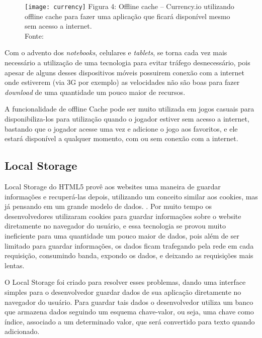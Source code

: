 \begin{figure}[H]
  \centering
	\texttt{[image: currency]}
	\footnotesize\hspace{8\baselineskip}
	Figura 4: Offline cache {--} Currency.io utilizando offline cache para
	fazer uma aplicação que ficará disponível mesmo sem acesso a internet. \\
	Fonte: \cite{website:currencyio}
  \label{img:currency}
\end{figure}

Com o advento dos \textit{notebooks}, celulares e \textit{tablets},
se torna cada vez mais necessário a utilização de uma tecnologia para
evitar tráfego desnecessário, pois apesar
de alguns desses dispositivos móveis possuirem conexão com a internet
onde estiverem (via 3G por exemplo) as velocidades não são
boas para fazer \textit{download} de uma quantidade um pouco maior de
recursos.

A funcionalidade de offline Cache pode ser muito utilizada em jogos casuais para
disponibiliza-los para utilização quando o jogador estiver sem acesso
a internet, bastando que o jogador acesse uma vez e adicione o jogo aos favoritos,
e ele estará disponível a qualquer momento, com ou sem conexão com a
internet.


\subsection{Local Storage}

Local Storage do HTML5 provê aos websites uma maneira de guardar
informações e recuperá-las depois, utilizando um conceito similar aos
cookies, mas já pensando em um grande modelo de dados. \cite{pilgrim2010html5}.
Por muito tempo os desenvolvedores utilizaram cookies para guardar
informações sobre o website diretamente no navegador do usuário, e
essa tecnologia se provou muito ineficiente para uma quantidade um
pouco maior de dados, pois além de ser limitado para guardar informações,
os dados ficam trafegando pela rede em cada requisição, consumindo
banda, expondo os dados, e deixando as requisições mais lentas.

O Local Storage foi criado para resolver esses problemas, dando uma
interface simples para o desenvolvedor guardar dados de sua
aplicação diretamente no navegador do usuário. Para guardar tais dados
o desenvolvedor utiliza um banco que armazena dados seguindo um
esquema chave-valor, ou seja, uma chave como índice, associado a um
determinado valor, que será convertido para texto quando adicionado.

